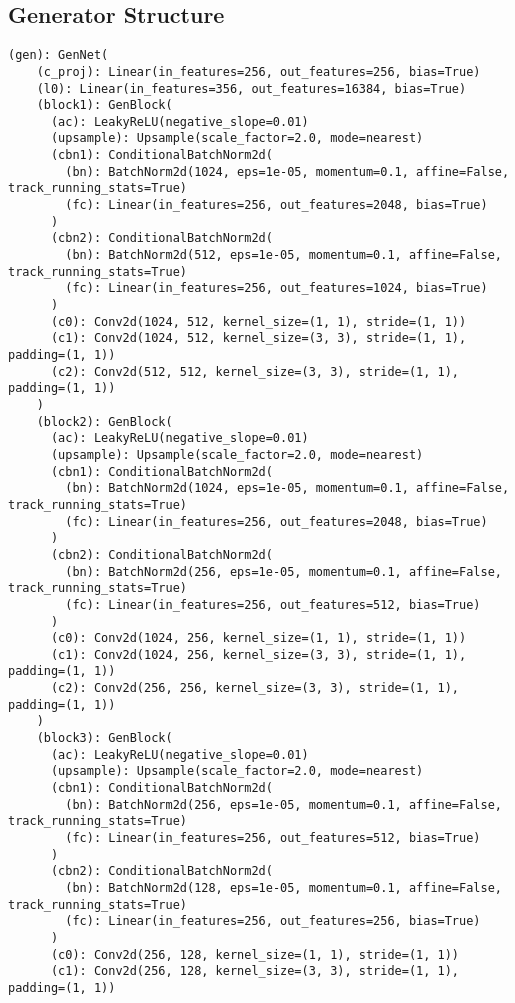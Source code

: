 \subsection{Generator Structure}
\begin{lstlisting}
(gen): GenNet(
    (c_proj): Linear(in_features=256, out_features=256, bias=True)
    (l0): Linear(in_features=356, out_features=16384, bias=True)
    (block1): GenBlock(
      (ac): LeakyReLU(negative_slope=0.01)
      (upsample): Upsample(scale_factor=2.0, mode=nearest)
      (cbn1): ConditionalBatchNorm2d(
        (bn): BatchNorm2d(1024, eps=1e-05, momentum=0.1, affine=False, track_running_stats=True)
        (fc): Linear(in_features=256, out_features=2048, bias=True)
      )
      (cbn2): ConditionalBatchNorm2d(
        (bn): BatchNorm2d(512, eps=1e-05, momentum=0.1, affine=False, track_running_stats=True)
        (fc): Linear(in_features=256, out_features=1024, bias=True)
      )
      (c0): Conv2d(1024, 512, kernel_size=(1, 1), stride=(1, 1))
      (c1): Conv2d(1024, 512, kernel_size=(3, 3), stride=(1, 1), padding=(1, 1))
      (c2): Conv2d(512, 512, kernel_size=(3, 3), stride=(1, 1), padding=(1, 1))
    )
    (block2): GenBlock(
      (ac): LeakyReLU(negative_slope=0.01)
      (upsample): Upsample(scale_factor=2.0, mode=nearest)
      (cbn1): ConditionalBatchNorm2d(
        (bn): BatchNorm2d(1024, eps=1e-05, momentum=0.1, affine=False, track_running_stats=True)
        (fc): Linear(in_features=256, out_features=2048, bias=True)
      )
      (cbn2): ConditionalBatchNorm2d(
        (bn): BatchNorm2d(256, eps=1e-05, momentum=0.1, affine=False, track_running_stats=True)
        (fc): Linear(in_features=256, out_features=512, bias=True)
      )
      (c0): Conv2d(1024, 256, kernel_size=(1, 1), stride=(1, 1))
      (c1): Conv2d(1024, 256, kernel_size=(3, 3), stride=(1, 1), padding=(1, 1))
      (c2): Conv2d(256, 256, kernel_size=(3, 3), stride=(1, 1), padding=(1, 1))
    )
    (block3): GenBlock(
      (ac): LeakyReLU(negative_slope=0.01)
      (upsample): Upsample(scale_factor=2.0, mode=nearest)
      (cbn1): ConditionalBatchNorm2d(
        (bn): BatchNorm2d(256, eps=1e-05, momentum=0.1, affine=False, track_running_stats=True)
        (fc): Linear(in_features=256, out_features=512, bias=True)
      )
      (cbn2): ConditionalBatchNorm2d(
        (bn): BatchNorm2d(128, eps=1e-05, momentum=0.1, affine=False, track_running_stats=True)
        (fc): Linear(in_features=256, out_features=256, bias=True)
      )
      (c0): Conv2d(256, 128, kernel_size=(1, 1), stride=(1, 1))
      (c1): Conv2d(256, 128, kernel_size=(3, 3), stride=(1, 1), padding=(1, 1))

\end{lstlisting}
